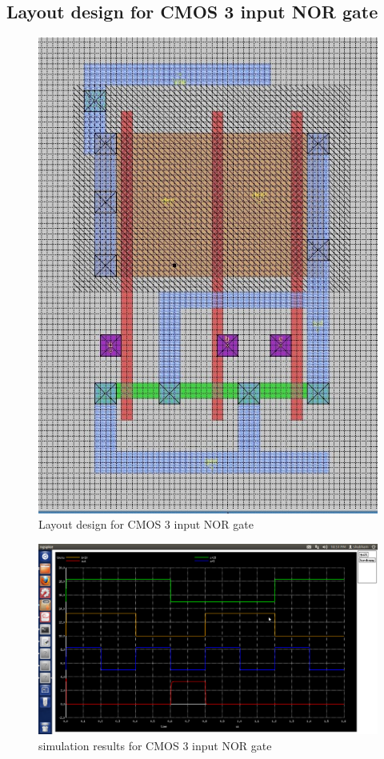 \documentclass[12pt,a4paper]{article}
\begin{document}
\begin{center}
\subsection{Layout design for CMOS 3 input NOR gate}
\vspace{15pt}
\begin{figure}[h]
\centering
\includegraphics[scale=.4]{3ipnor_magic.jpg}
\caption[Short]{Layout design for CMOS 3 input NOR gate }
\end{figure}

\begin{figure}[h]
\centering
\includegraphics[scale=.25]{3ipnorsm.png}
\caption[Short]{simulation results for CMOS 3 input NOR gate}
\end{figure}


\end{center}
\end{document}
